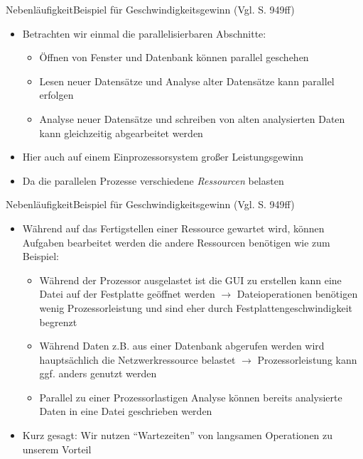 \begin{frame}{Nebenläufigkeit}{Beispiel für Geschwindigkeitsgewinn (Vgl. \cite{ullenboom2018java} S. 949ff)}
    \begin{itemize}
        \item Betrachten wir einmal die parallelisierbaren Abschnitte:
        \begin{itemize}
            \item Öffnen von Fenster und Datenbank können parallel geschehen
            \item Lesen neuer Datensätze und Analyse alter Datensätze kann parallel erfolgen
            \item Analyse neuer Datensätze und schreiben von alten analysierten Daten kann gleichzeitig abgearbeitet werden
        \end{itemize}
        \item Hier auch auf einem Einprozessorsystem großer Leistungsgewinn
        \item Da die parallelen Prozesse verschiedene \textit{Ressourcen} belasten
    \end{itemize}
\end{frame}

\begin{frame}{Nebenläufigkeit}{Beispiel für Geschwindigkeitsgewinn (Vgl. \cite{ullenboom2018java} S. 949ff)}
    \begin{itemize}
        \item Während auf das Fertigstellen einer Ressource gewartet wird, können Aufgaben bearbeitet werden die andere Ressourcen benötigen wie zum Beispiel:
        \begin{itemize}
            \item Während der Prozessor ausgelastet ist die GUI zu erstellen kann eine Datei auf der Festplatte geöffnet werden $\rightarrow$ Dateioperationen benötigen wenig Prozessorleistung und sind eher durch Festplattengeschwindigkeit begrenzt
            \item Während Daten z.B. aus einer Datenbank abgerufen werden wird hauptsächlich die Netzwerkressource belastet $\rightarrow$ Prozessorleistung kann ggf. anders genutzt werden
            \item Parallel zu einer Prozessorlastigen Analyse können bereits analysierte Daten in eine Datei geschrieben werden
        \end{itemize}
        \item Kurz gesagt: Wir nutzen "`Wartezeiten"' von langsamen Operationen zu unserem Vorteil
    \end{itemize}
\end{frame}

